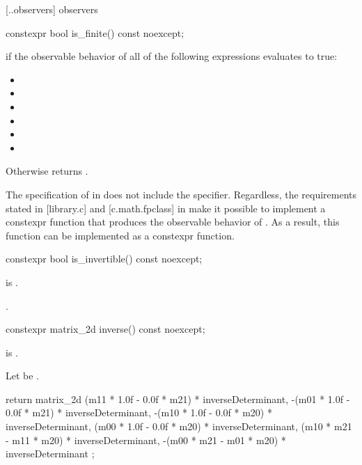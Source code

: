  [\iotwod.\matrixtwod.observers] { observers}

%
\begin{itemdecl}
constexpr bool is_finite() const noexcept;
\end{itemdecl}
\begin{itemdescr}
\pnum
\returns
{} if the observable behavior of all of the following expressions evaluates to true:
\begin{itemize}
\item {}
\item {}
\item {}
\item {}
\item {}
\item {}
\end{itemize}

\pnum
Otherwise returns .

\pnum
\begin{note}
The specification of  in \cppseventeen does not include the  specifier. Regardless, the requirements stated in [library.c] and [c.math.fpclass] in \cppseventeen make it possible to implement a constexpr function that produces the observable behavior of . As a result, this function can be implemented as a constexpr function.
\end{note}
\end{itemdescr}

%
\begin{itemdecl}
constexpr bool is_invertible() const noexcept;
\end{itemdecl}
\begin{itemdescr}
\pnum
\requires
{} is .

\pnum
\returns
{}.
\end{itemdescr}

%
\begin{itemdecl}
constexpr matrix_2d inverse() const noexcept;
\end{itemdecl}
\begin{itemdescr}
\pnum
\requires
{} is .

\pnum
\returns
Let  be .

\begin{codeblock}
return matrix_2d{
   (m11 * 1.0f - 0.0f * m21) * inverseDeterminant,
  -(m01 * 1.0f - 0.0f * m21) * inverseDeterminant,
  -(m10 * 1.0f - 0.0f * m20) * inverseDeterminant,
   (m00 * 1.0f - 0.0f * m20) * inverseDeterminant,
   (m10 * m21 - m11 * m20) * inverseDeterminant,
  -(m00 * m21 - m01 * m20) * inverseDeterminant
};
\end{codeblock}
\end{itemdescr}

